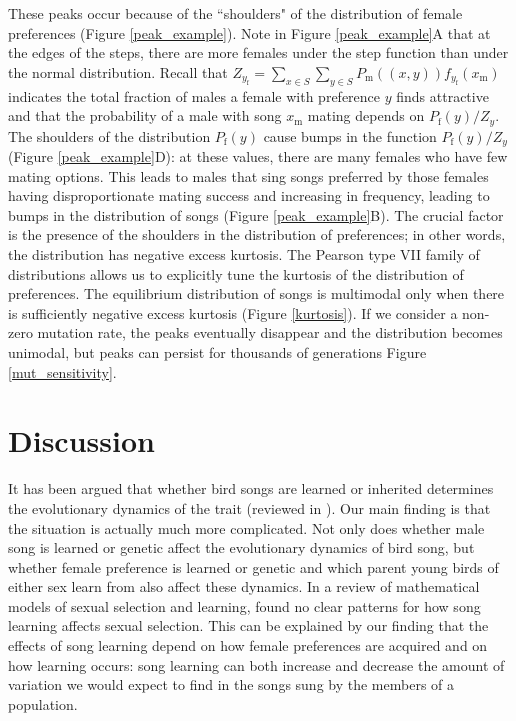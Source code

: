 \documentclass[12pt]{article}
\newcommand{\x}[1]{\text{#1}}
\begin{document}
These peaks occur because of the ``shoulders" of the distribution of female preferences (Figure \ref{peak_example}). Note in Figure \ref{peak_example}A that at the edges of the steps, there are more females under the step function than under the normal distribution. Recall that $Z_{y_\x{f}}=\sum_{x\in S}\sum_{y\in S}P_\x{m}((x,y))f_{y_\x{f}}(x_\x{m})$ indicates the total fraction of males a female with preference $y$ finds attractive and that the probability of a male with song $x_\x{m}$ mating depends on $P_\x{f}(y)/Z_y$. The shoulders of the distribution $P_\x{f}(y)$ cause bumps in the function $P_\x{f}(y)/Z_y$ (Figure \ref{peak_example}D): at these values, there are many females who have few mating options. This leads to males that sing songs preferred by those females having disproportionate mating success and increasing in frequency, leading to bumps in the distribution of songs (Figure \ref{peak_example}B). The crucial factor is the presence of the shoulders in the distribution of preferences; in other words, the distribution has negative excess kurtosis. The Pearson type VII family of distributions allows us to explicitly tune the kurtosis of the distribution of preferences. The equilibrium distribution of songs is multimodal only when there is sufficiently negative excess kurtosis (Figure \ref{kurtosis}). If we consider a non-zero mutation rate, the peaks eventually disappear and the distribution becomes unimodal, but peaks can persist for thousands of generations Figure \ref{mut_sensitivity}.



\section*{Discussion}

It has been argued that whether bird songs are learned or inherited determines the evolutionary dynamics of the trait (reviewed in \cite{Wilkins:2012ve,Lachlan:2004tg}). Our main finding is that the situation is actually much more complicated. Not only does whether male song is learned or genetic affect the evolutionary dynamics of bird song, but  whether female preference is learned or genetic and which parent young birds of either sex learn from also affect these dynamics. 
In a review of mathematical models of sexual selection and learning, \citet{Verzijden:2012uq} found no clear patterns for how song learning affects sexual selection. This can be explained by our finding that the effects of song learning depend on how female preferences are acquired and on how learning occurs: song learning can both increase and decrease the amount of variation we would expect to find in the songs sung by the members of a population.
\end{document}
